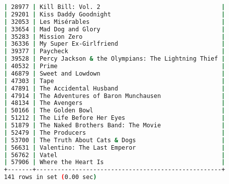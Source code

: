 \begin{lstlisting}[language=bash]
| 28977 | Kill Bill: Vol. 2                                  |
| 29201 | Kiss Daddy Goodnight                               |
| 32053 | Les Misérables                                     |
| 33654 | Mad Dog and Glory                                  |
| 35283 | Mission Zero                                       |
| 36336 | My Super Ex-Girlfriend                             |
| 39377 | Paycheck                                           |
| 39528 | Percy Jackson & the Olympians: The Lightning Thief |
| 40532 | Prime                                              |
| 46879 | Sweet and Lowdown                                  |
| 47303 | Tape                                               |
| 47891 | The Accidental Husband                             |
| 47914 | The Adventures of Baron Munchausen                 |
| 48134 | The Avengers                                       |
| 50166 | The Golden Bowl                                    |
| 51212 | The Life Before Her Eyes                           |
| 51879 | The Naked Brothers Band: The Movie                 |
| 52479 | The Producers                                      |
| 53700 | The Truth About Cats & Dogs                        |
| 56631 | Valentino: The Last Emperor                        |
| 56762 | Vatel                                              |
| 57906 | Where the Heart Is                                 |
+-------+----------------------------------------------------+
141 rows in set (0.00 sec)
\end{lstlisting}

